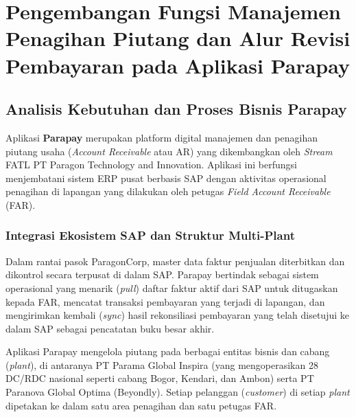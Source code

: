 \chapter{Pengembangan Fungsi Manajemen Penagihan Piutang dan Alur Revisi Pembayaran pada Aplikasi Parapay}

\section{Analisis Kebutuhan dan Proses Bisnis Parapay}
Aplikasi \textbf{Parapay} merupakan platform digital manajemen dan penagihan piutang usaha (\textit{Account Receivable} atau AR) yang dikembangkan oleh \textit{Stream} FATL PT Paragon Technology and Innovation. Aplikasi ini berfungsi menjembatani sistem ERP pusat berbasis SAP dengan aktivitas operasional penagihan di lapangan yang dilakukan oleh petugas \textit{Field Account Receivable} (FAR).

\subsection{Integrasi Ekosistem SAP dan Struktur Multi-Plant}
Dalam rantai pasok ParagonCorp, master data faktur penjualan diterbitkan dan dikontrol secara terpusat di dalam SAP. Parapay bertindak sebagai sistem operasional yang menarik (\textit{pull}) daftar faktur aktif dari SAP untuk ditugaskan kepada FAR, mencatat transaksi pembayaran yang terjadi di lapangan, dan mengirimkan kembali (\textit{sync}) hasil rekonsiliasi pembayaran yang telah disetujui ke dalam SAP sebagai pencatatan buku besar akhir.

Aplikasi Parapay mengelola piutang pada berbagai entitas bisnis dan cabang (\textit{plant}), di antaranya PT Parama Global Inspira (yang mengoperasikan 28 DC/RDC nasional seperti cabang Bogor, Kendari, dan Ambon) serta PT Paranova Global Optima (Beyondly). Setiap pelanggan (\textit{customer}) di setiap \textit{plant} dipetakan ke dalam satu area penagihan dan satu petugas FAR.

